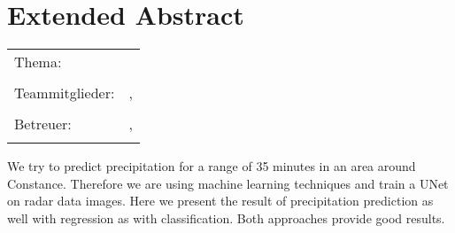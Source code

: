 \chapter*{Extended Abstract}

\begin{center}
	\begingroup
	\renewcommand*{\arraystretch}{1}
	{\makeatletter	
		\begin{tabular}{p{3.2cm}p{9.6cm}}
			Thema: & \thema \\
			& \\
			Teammitglieder: & \verfasserA, \verfasserB \\
			& \\
			Betreuer: & \hoschschule \newline \institut \newline \prueferA, \prueferB \\
			& \\
		\end{tabular}
		
		\makeatother}
	\endgroup
\end{center}

\bigskip

We try to predict precipitation for a range of 35 minutes in an area around Constance.
Therefore we are using machine learning techniques and train a UNet on radar data images. 
Here we present the result of precipitation prediction as well with regression as with classification. 
Both approaches provide good results.


\printbibliography[title={Referenzen}, heading=subbibliography]

